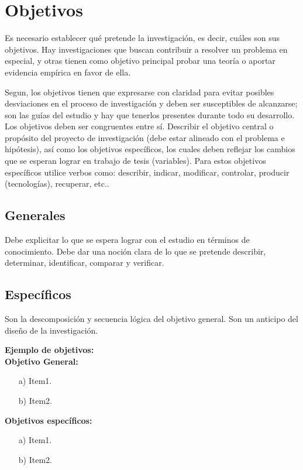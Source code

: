 \section{Objetivos}
Es necesario establecer qué pretende la investigación, es decir, cuáles son sus objetivos. Hay investigaciones que buscan contribuir a resolver un problema en especial, y otras tienen como objetivo principal probar una teoría o aportar evidencia empírica en favor de ella. \par 
\vskip 0.3cm
Segun, los objetivos tienen que expresarse con claridad para evitar posibles desviaciones en el proceso de investigación y deben ser susceptibles de alcanzarse; son las guías del estudio y hay que tenerlos presentes durante todo su desarrollo. Los objetivos deben ser congruentes entre sí.
\vskip 0.3cm
Describir el objetivo central o propósito del proyecto de investigación (debe estar alineado con el problema e hipótesis), así como los objetivos específicos, los cuales deben reflejar los cambios que se esperan lograr en trabajo de tesis (variables). Para estos objetivos específicos utilice verbos como: describir, indicar, modificar, controlar, producir (tecnologías), recuperar, etc..

\subsection{Generales}
Debe explicitar lo que se espera lograr con el estudio en términos de conocimiento. Debe dar una noción clara de lo que se pretende describir, determinar, identificar, comparar y verificar.


\subsection{Específicos}
Son la descomposición y secuencia lógica del objetivo general. Son un anticipo del diseño de la investigación.
\vskip 0.3cm



{\bf Ejemplo de objetivos:}\\
{\bf Objetivo General:}
\begin{enumerate}
\item[a)] Item1.
\vskip 0.3cm
\item[b)] Item2.
\end{enumerate}
\vskip 0.2cm
{\bf Objetivos específicos:}
\begin{enumerate}
\item[a)] Item1.
\item[b)] Item2.
\end{enumerate}
